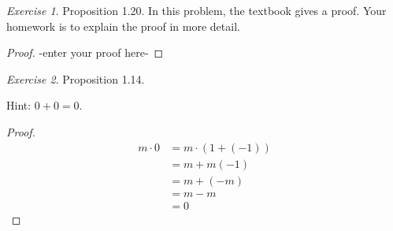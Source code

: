\documentclass[12pt,oneside]{amsart}
\theoremstyle{remark}
\newtheorem{exer}{Exercise}
\begin{document}
\newpage
\begin{exer}
Proposition 1.20. In this problem, the textbook gives a proof. Your homework is to explain the proof in more detail.
\end{exer}

\begin{proof}
-enter your proof here-
\end{proof}

\newpage
\begin{exer}
Proposition 1.14.

Hint: $0 + 0 = 0.$
\end{exer}

\begin{proof}
\begin{align*}
m \cdot 0 &= m \cdot (1 + (-1)) \\
          &= m + m(-1) \\
          &= m + (-m) \\
          &= m - m \\
          &= 0
\end{align*}
\end{proof}
\end{document}
